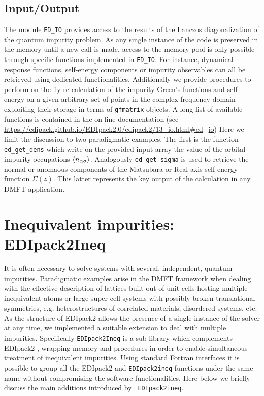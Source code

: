 \documentclass[preprint,3p,10pt]{elsarticle}
\def\a{\alpha}       \def\b{\beta}   \def\g{\gamma}   \def\d{\delta}
\def\NAME{{\rm EDIpack2 }}
\begin{document}
\subsection{Input/Output}\label{sSecIO}
The module {\tt ED\_IO} provides access to the results of the Lanczos
diagonalization of the quantum impurity problem.
As any single instance of the code is preserved in the memory until a
new call is made, access to the memory pool is only possible through
specific functions implemented in {\tt ED\_IO}. For instance, dynamical response functions, self-energy components or impurity
observables can all be retrieved using dedicated functionalities.
Additionally we provide procedures to perform on-the-fly
re-calculation of the impurity Green's functions and self-energy on a
given arbitrary set of points in the complex frequency domain
exploiting their storage in terms of {\tt gfmatrix} objects.
A long list of available functions is contained in the on-line
documentation (see
\href{https://edipack.github.io/EDIpack2.0/edipack2/13_io.html#ed-io}{https://edipack.github.io/EDIpack2.0/edipack2/13\_io.html\#ed$-$io})
Here we limit the discussion to two paradigmatic examples.
The first is the function {\tt ed\_get\_dens} which write on the
provided input array the value of the orbital impurity occupations
$\langle n_{\a\s}\rangle$. Analogously {\tt ed\_get\_sigma} is used to
retrieve the normal or anomaous components of the Matsubara or
Real-axis self-energy function $\Sigma(z)$. This latter represents the
key output of the calculation in 
any DMFT application. 












\section{Inequivalent impurities: EDIpack2Ineq}\label{SecIneq}
It is often necessary to solve systems with several, independent,
quantum impurities. Paradigmatic examples arise in the DMFT
framework when dealing with the effective description of lattices
built out of unit cells hosting multiple inequivalent atoms or large
super-cell systems with possibly broken translational symmetries,
e.g. heterostructures of correlated materials, disordered systems,
etc.
As the structure of \NAME allows the presence of a single instance of
the solver at any time, we implemented a suitable extension to deal
with multiple impurities. Specifically {\tt EDIpack2Ineq} is a
sub-library which complements \NAME, wrapping memory and procedures in
order to enable simultaneous treatment of  inequivalent impurities. 
Using standard Fortran interfaces it is possible to group all the
\NAME and {\tt EDIpack2ineq} functions under the same name without
compromising the software functionalities.  
Here below we briefly discuss the main additions introduced by {\tt
  EDIpack2ineq}. 
\end{document}
